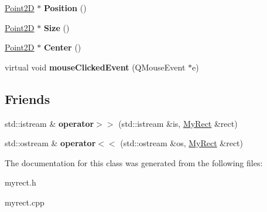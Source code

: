 \begin{DoxyCompactItemize}
\hyperlink{classPoint2D}{Point2D} $\ast$ {\bfseries Position} ()
\item 
\mbox{\label{classMyRect_ad9bc8a8c51f3c99bdcb0ea417757a086}} 
\hyperlink{classPoint2D}{Point2D} $\ast$ {\bfseries Size} ()
\item 
\mbox{\label{classMyRect_a54af9ff8c6856ee11ea43b5499707877}} 
\hyperlink{classPoint2D}{Point2D} $\ast$ {\bfseries Center} ()
\item 
\mbox{\label{classMyRect_a87d65ecd22add421fc3a2a9ac777ce91}} 
virtual void {\bfseries mouse\+Clicked\+Event} (Q\+Mouse\+Event $\ast$e)
\end{DoxyCompactItemize}
\subsection*{Friends}
\begin{DoxyCompactItemize}
\item 
\mbox{\label{classMyRect_a0776fa667a382b15220104e62f6d4f7b}} 
std\+::istream \& {\bfseries operator$>$$>$} (std\+::istream \&is, \hyperlink{classMyRect}{My\+Rect} \&rect)
\item 
\mbox{\label{classMyRect_a7d9295e04322b6022fabd8cbff944c3e}} 
std\+::ostream \& {\bfseries operator$<$$<$} (std\+::ostream \&os, \hyperlink{classMyRect}{My\+Rect} \&rect)
\end{DoxyCompactItemize}


The documentation for this class was generated from the following files\+:\begin{DoxyCompactItemize}
\item 
myrect.\+h\item 
myrect.\+cpp\end{DoxyCompactItemize}
